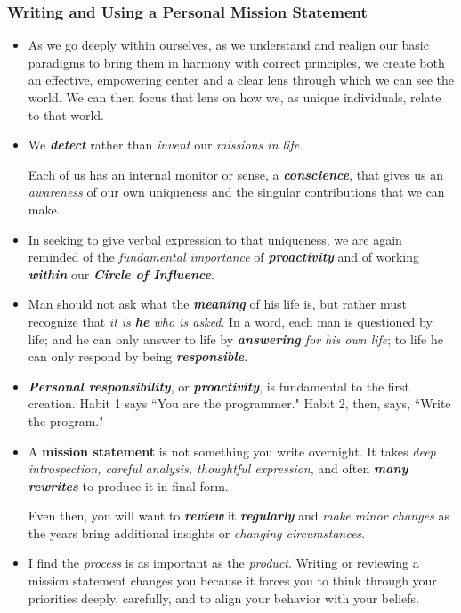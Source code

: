 \documentclass[11pt]{article}
\begin{document}
\subsubsection{Writing and Using a Personal Mission Statement}
\begin{itemize}
\item As we go deeply within ourselves, as we understand and realign our basic paradigms to bring them in harmony with correct principles, we create both an effective, empowering center and a clear lens through which we can see the world. We can then focus that lens on how we, as unique individuals, relate to that world.

\item We \emph{\textbf{detect}} rather than \emph{invent} our \emph{missions in life}. 

Each of us has an internal monitor or sense, a \emph{\textbf{conscience}}, that gives us an \emph{awareness} of our own uniqueness and the singular contributions that we can make.

\item In seeking to give verbal expression to that uniqueness, we are again reminded of the \emph{fundamental importance} of \emph{\textbf{proactivity}} and of working \emph{\textbf{within}} our \emph{\textbf{Circle of Influence}}. 

\item Man should not ask what the \emph{\textbf{meaning}} of his life is, but rather must recognize that \emph{it is \textbf{he} who is asked}. In a word, each
man is questioned by life; and he can only answer to life by \emph{\textbf{answering} for his own life}; to life he can only respond by being \emph{\textbf{responsible}}.

\item \emph{\textbf{Personal responsibility}}, or \emph{\textbf{proactivity}}, is fundamental to the first creation. Habit 1 says ``You are the programmer." Habit 2, then, says, ``Write the program."

\item A \textbf{mission statement} is not something you write overnight. It takes \emph{deep introspection, careful analysis, thoughtful expression}, and often \emph{\textbf{many rewrites}} to produce it in final form.

Even then, you will want to \emph{\textbf{review}} it \emph{\textbf{regularly}} and \emph{make minor changes} as the years bring additional insights or \textit{changing circumstances}.

\item I find the \emph{process} is as important as the \emph{product}. Writing or reviewing a mission statement changes you because it forces you to think through your priorities deeply, carefully, and to align your behavior with your beliefs. 
\end{itemize}
\end{document}
